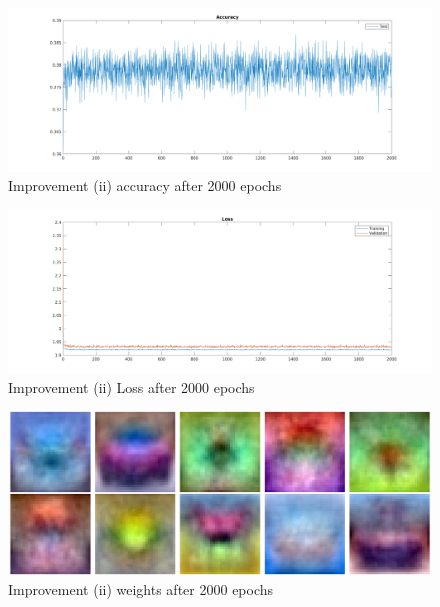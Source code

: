     \begin{figure}[ht]
        \includegraphics[width=\textwidth]{../code/result_pics/train_longer/2000_accuracy.png}
        \caption{Improvement (ii) accuracy after 2000 epochs}
        \label{fig:accuracyb}
    \end{figure}
    \begin{figure}[ht]
        \includegraphics[width=\textwidth]{../code/result_pics/train_longer/2000_loss.png}
        \caption{Improvement (ii) Loss after 2000 epochs}
        \label{fig:lossb}
    \end{figure}
    \begin{figure}[ht]
        \includegraphics[width=\textwidth]{../code/result_pics/train_longer/2000_weights.png}
        \caption{Improvement (ii) weights after 2000 epochs}
        \label{fig:weightsb}
    \end{figure}

\clearpage

